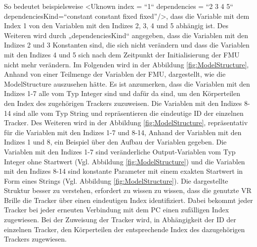 So bedeutet beispielsweise <Uknown index  = “1“ dependencies = “2 3 4 5“ dependenciesKind=“constant constant fixed fixed”/>, dass die Variable mit dem Index 1 von den Variablen mit den Indizes 2, 3, 4 und 5 abhängig ist. Des Weiteren wird durch „dependenciesKind“ angegeben, dass die Variablen mit den Indizes 2 und 3 Konstanten sind, die sich nicht verändern und dass die Variablen mit den Indizes 4 und 5 sich nach dem Zeitpunkt der Initialisierung der FMU nicht mehr verändern.
\newline\newline
Im Folgenden wird in der Abbildung \ref{fig:ModelStructure}, Anhand von einer Teilmenge der Variablen der FMU, dargestellt, wie die ModelStructure auszusehen hätte. Es ist anzumerken, dass die Variablen mit den Indizes 1-7 alle vom Typ Integer sind und dafür da sind, um den Körperteilen den Index des zugehörigen Trackers zuzuweisen. Die Variablen mit den Indizes 8-14 sind alle vom Typ String und repräsentieren die eindeutige ID der einzelnen Tracker. Des Weiteren wird in der Abbildung \ref{fig:ModelStructure}, repräsentativ für die Variablen mit den Indizes 1-7 und 8-14, Anhand der Variablen mit den Indizes 1 und 8, ein Beispiel über den Aufbau der Variablen gegeben. Die Variablen mit den Indizes 1-7 sind veränderliche Output-Variablen vom Typ Integer ohne Startwert (Vgl. Abbildung \ref{fig:ModelStructure}) und die Variablen mit den Indizes 8-14 sind konstante Parameter mit einem exakten Startwert in Form eines Strings (Vgl. Abbildung \ref{fig:ModelStructure}). Die dargestellte Struktur besser zu verstehen, erfordert zu wissen zu wissen, dass die genutzte VR Brille die Tracker über einen eindeutigen Index identifiziert. Dabei bekommt jeder Tracker bei jeder erneuten Verbindung mit dem PC einen zufälligen Index zugewiesen. Bei der Zuweisung der Tracker wird, in Abhängigkeit der ID der einzelnen Tracker, den Körperteilen der entsprechende Index des dazugehörigen Trackers zugewiesen.
